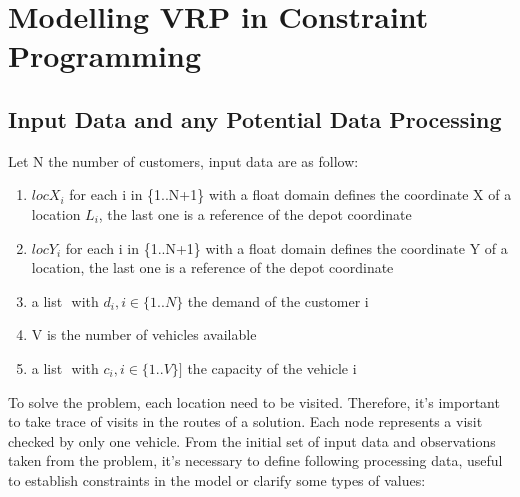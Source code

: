 \chapter{Modelling VRP in Constraint Programming}
\section{Input Data and any Potential Data Processing}
Let N the number of customers, input data are as follow:
\begin{enumerate}
    \item \begin{math}locX_{i}\end{math} for each i in \{1..N+1\} with a float domain defines the coordinate X of a location \begin{math}L_{i}\end{math}, the last one is a reference of the depot coordinate 
    \item \begin{math}locY_{i}\end{math} for each i in \{1..N+1\} with a float domain defines the coordinate Y of a location, the last one is a reference of the depot coordinate
    \item a list \begin{math}[de_{1}, ..., de_{N}]\end{math} with \begin{math}d_{i}, i \in \{1..N\}\end{math} the demand of the customer i
    \item V is the number of vehicles available
    \item a list \begin{math}[c_{1},..., c_{V}]\end{math} with \begin{math} c_{i}, i \in \{1..V\}]\end{math} the capacity of the vehicle i
\end{enumerate}
To solve the problem, each location need to be visited. Therefore, it's important to take trace of visits in the routes of a solution. Each node represents a visit checked by only one vehicle. 
From the initial set of input data and observations taken from the problem, it's necessary to define following processing data, useful to establish constraints in the model or clarify some types of values:
